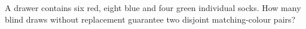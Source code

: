 A drawer contains six red, eight blue and four green individual socks. How many blind draws without replacement guarantee two disjoint matching-colour pairs?
